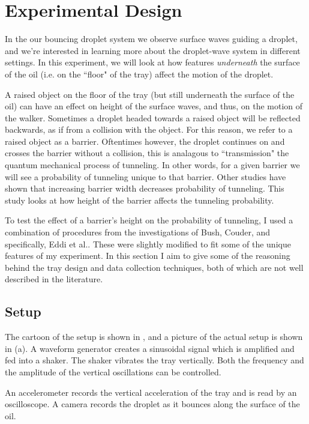 \chapter{Experimental Design}

In the our bouncing droplet system we observe surface waves guiding a droplet, and we're interested in learning more about the droplet-wave system in different settings. In this experiment, we will look at how features \textit{underneath} the surface of the oil (i.e. on the ``floor" of the tray) affect the motion of the droplet. 

A raised object on the floor of the tray (but still underneath the surface of the oil) can have an effect on height of the surface waves, and thus, on the motion of the walker. Sometimes a droplet headed towards a raised object will be reflected backwards, as if from a collision with the object. For this reason, we refer to a raised object as a barrier. Oftentimes however, the droplet continues on and crosses the barrier without a collision, this is analagous to ``transmission" the quantum mechanical process of tunneling. In other words, for a given barrier we will see a probability of tunneling unique to that barrier. Other studies have shown that increasing barrier width decreases probability of tunneling. This study looks at how height of the barrier affects the tunneling probability. 

To test the effect of a barrier's height on the probability of tunneling, I used a combination of procedures from the investigations of Bush, Couder, and specifically, Eddi et al.. These were slightly modified to fit some of the unique features of my experiment. In this section I aim to give some of the reasoning behind the tray design and data collection techniques, both of which are not well described in the literature.

\section{Setup}
    The cartoon of the setup is shown in , and a picture of the actual setup is shown in (a). A waveform generator creates a sinusoidal signal which is amplified and fed into a shaker. The shaker vibrates the tray vertically. Both the frequency and the amplitude of the vertical oscillations can be controlled. 
    
    An accelerometer records the vertical acceleration of the tray and is read by an oscilloscope. A camera records the droplet as it bounces along the surface of the oil.  
    
